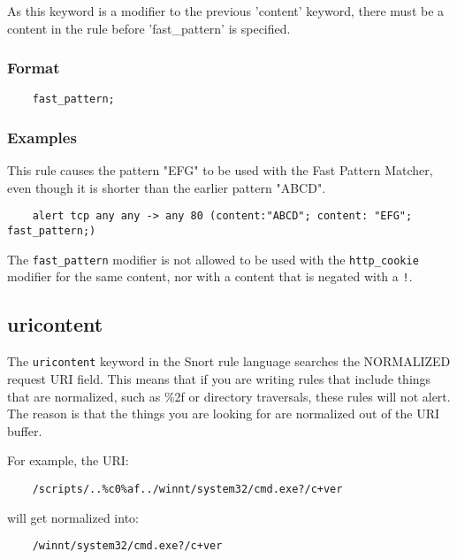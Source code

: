 \documentclass[english]{report}
\newenvironment{note}{
\samepage
    \vspace{10pt}{\textsf{
        {\hspace{7pt}\Huge{$\triangle$\hspace{-12.5pt}{\Large{$^!$}}}}\hspace{5pt}
        {\Large{NOTE}}
    }
    }
   \begin{center}
    \par\vspace{-17pt}

    \begin{lrbox}{\savepar}
    \begin{minipage}[r]{6in}
}
{
    \end{minipage}
    \end{lrbox}
    \fbox{
        \usebox{
            \savepar
	}
    }
    \par\vskip10pt
    \end{center}
}
\newenvironment{note}{
        \begin{rawhtml}
        <p><table border="1"><tr><td><b>
        Note:&nbsp;&nbsp;</b>
        \end{rawhtml}
}{
        \begin{rawhtml}
        </b></td></tr></table></p>
        \end{rawhtml}
}
\begin{document}
As this keyword is a modifier to the previous 'content' keyword, there must be
a content in the rule before 'fast\_pattern' is specified.

\subsubsection{Format}

\begin{verbatim}
    fast_pattern;
\end{verbatim}

\subsubsection{Examples}

This rule causes the pattern "EFG" to be used with the Fast Pattern Matcher,
even though it is shorter than the earlier pattern "ABCD".

\begin{verbatim}
    alert tcp any any -> any 80 (content:"ABCD"; content: "EFG"; fast_pattern;)
\end{verbatim}

\begin{note}

The \texttt{fast\_pattern} modifier is not allowed to be used with the
\texttt{http\_cookie} modifier for the same content, nor with a content that is
negated with a \texttt{!}.

\end{note}

\subsection{uricontent}
\label{sub:UriContent}

The \texttt{uricontent} keyword in the Snort rule language searches the
NORMALIZED request \textsc{URI} field.  This means that if you are writing
rules that include things that are normalized, such as \%2f or directory
traversals, these rules will not alert.  The reason is that the things you are
looking for are normalized out of the URI buffer.  

For example, the URI: 

\begin{verbatim}
    /scripts/..%c0%af../winnt/system32/cmd.exe?/c+ver
\end{verbatim}

will get normalized into:

\begin{verbatim}
    /winnt/system32/cmd.exe?/c+ver
\end{verbatim}
\end{document}
